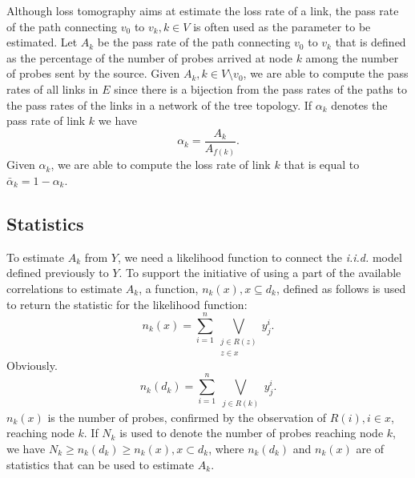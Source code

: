 \documentclass[10pt,onecolumn]{IEEEtran}
\begin{document}
 Although loss tomography aims at estimate the loss rate of a link,  the pass rate of the path connecting $v_0$ to $v_k, k \in V$ is often used as the parameter  to be estimated. Let $A_k$ be the pass rate of the path connecting $v_0$ to $v_k$ that is defined as the percentage of the number of probes arrived at node $k$ among the number of probes sent by the source.  Given $A_k, k \in V\setminus v_0$, we are able to compute the pass rates of all links in $E$ since there is a bijection from the pass rates of the paths to the pass rates of the links in a network of the tree topology.  If $\alpha_k$ denotes the pass rate of link $k$ we have
 \begin{equation}
 \alpha_k=\dfrac{A_k}{A_{f(k)}}.
 \end{equation}
Given $\alpha_k$, we are able to compute the loss rate of link $k$ that is equal to $\bar{\alpha}_k=1-\alpha_k$.


\subsection{Statistics}

\label{mlesection}

To estimate  $A_k$ from $Y$, we need a likelihood function to connect the {\it i.i.d.} model defined previously to $Y$. To support the initiative of using a part of the available correlations to estimate $A_k$, a function, $n_k(x), x \subseteq d_k$, defined as follows is used to return the statistic for the likelihood function:
 \begin{equation}
 n_k(x)=\sum_{i=1}^n \bigvee_{\substack{j \in R(z)\\ z \in x}} y_j^i.
 \label{nk2}
 \end{equation}
Obviously.
\begin{equation}
 n_k(d_k)=\sum_{i=1}^n \bigvee_{\substack{j \in R(k)}} y_j^i.
 \label{nk1}
 \end{equation} \noindent  $n_k(x)$ is the number of probes, confirmed by the observation of $R(i), i \in x$, reaching node $k$. If $N_k$ is used to denote the number of probes reaching node $k$, we have $N_k \geq n_k(d_k)\geq n_k(x), x \subset d_k$, where $n_k(d_k)$ and $n_k(x)$ are of statistics that can be used to estimate $A_k$.
\end{document}
